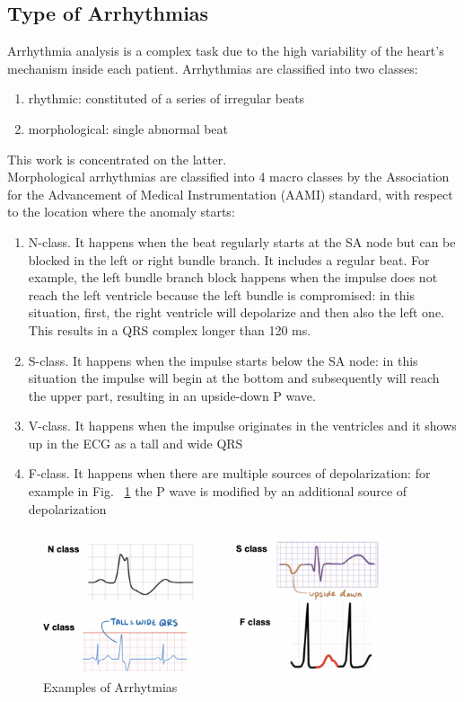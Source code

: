 \documentclass[LaM,binding=0.6cm]{sapthesis}
\begin{document}
\subsection{Type of Arrhythmias}
Arrhythmia analysis is a complex task due to the high variability of the heart's mechanism inside each patient. Arrhythmias are classified into two classes:
\begin{enumerate}
\item rhythmic: constituted of a series of irregular beats
\item morphological: single abnormal beat
\end{enumerate}
This work is concentrated on the latter.\\Morphological arrhythmias are classified into 4 macro classes by the Association for the Advancement of Medical Instrumentation (AAMI) standard, with respect to the location where the anomaly starts:
\begin{enumerate}
\item N-class. It happens when the beat regularly starts at the SA node but can be blocked in the left or right bundle branch. It includes a regular beat. For example, the left bundle branch block happens when the impulse does not reach the left ventricle because the left bundle is compromised: in this situation, first, the right ventricle will depolarize and then also the left one. This results in a QRS complex longer than 120 ms.
\item S-class. It happens when the impulse starts below the SA node: in this situation the impulse will begin at the bottom and subsequently will reach the upper part, resulting in an upside-down P wave.
\item V-class. It happens when the impulse originates in the ventricles and it shows up in the ECG as a tall and wide QRS
\item F-class. It happens when there are multiple sources of depolarization: for example in Fig. ~\ref{fig:arrhex} the P wave is modified by an additional source of depolarization
\end{enumerate}
\begin{figure}[H]  \centering
    \includegraphics[width=100mm,scale=0.7]{arrhex}
    \caption{Examples of Arrhytmias}
    \label{fig:arrhex}
\end{figure}
\end{document}
